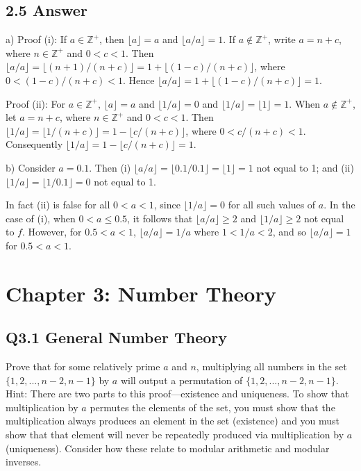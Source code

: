 \documentclass{article}
\begin{document}
\subsection*{2.5 Answer}
a) Proof (i): If \( a \in \mathbb{Z}^+ \), then \( \lfloor a \rfloor = a \) and \( \lfloor a/a \rfloor = 1 \). If \( a \notin \mathbb{Z}^+ \), write \( a = n + c \), where \( n \in \mathbb{Z}^+ \) and \( 0 < c < 1 \). Then \( \lfloor a/a \rfloor = \lfloor (n + 1)/(n + c) \rfloor = 1 + \lfloor (1 - c)/(n + c) \rfloor \), where \( 0 < (1 - c)/(n + c) < 1 \). Hence \( \lfloor a/a \rfloor = 1 + \lfloor (1 - c)/(n + c) \rfloor = 1 \).

Proof (ii): For \( a \in \mathbb{Z}^+ \), \( \lfloor a \rfloor = a \) and \( \lfloor 1/a \rfloor = 0 \) and \( \lfloor 1/a \rfloor = \lfloor 1 \rfloor = 1 \). When \( a \notin \mathbb{Z}^+ \), let \( a = n + c \), where \( n \in \mathbb{Z}^+ \) and \( 0 < c < 1 \). Then \( \lfloor 1/a \rfloor = \lfloor 1/(n + c) \rfloor = 1 - \lfloor c/(n + c) \rfloor \), where \( 0 < c/(n + c) < 1 \). Consequently \( \lfloor 1/a \rfloor = 1 - \lfloor c/(n + c) \rfloor = 1 \).

b) Consider \( a = 0.1 \). Then
(i) \( \lfloor a/a \rfloor = \lfloor 0.1/0.1 \rfloor = \lfloor 1 \rfloor = 1 \) not equal to 1; and
(ii) \( \lfloor 1/a \rfloor = \lfloor 1/0.1 \rfloor = 0 \) not equal to 1.

In fact (ii) is false for all \( 0 < a < 1 \), since \( \lfloor 1/a \rfloor = 0 \) for all such values of \( a \). In the case of (i), when \( 0 < a \leq 0.5 \), it follows that \( \lfloor a/a \rfloor \geq 2 \) and \( \lfloor 1/a \rfloor \geq 2 \) not equal to \( f \). However, for \( 0.5 < a < 1 \), \( \lfloor a/a \rfloor = 1/a \) where \( 1 < 1/a < 2 \), and so \( \lfloor a/a \rfloor = 1 \) for \( 0.5 < a < 1 \).
\newpage
\section*{Chapter 3: Number Theory}
\subsection*{Q3.1 General Number Theory}
Prove that for some relatively prime $a$ and $n$, multiplying all numbers in the set $\{1,2,...,n-2,n-1\}$ by $a$ will output a permutation of $\{1,2,...,n-2,n-1\}$.
\\ Hint: There are two parts to this proof---existence and uniqueness. To show that multiplication by $a$ permutes the elements of the set, you must show that the multiplication always produces an element in the set (existence) and you must show that that element will never be repeatedly produced via multiplication by $a$ (uniqueness). Consider how these relate to modular arithmetic and modular inverses.
\newpage
\end{document}
